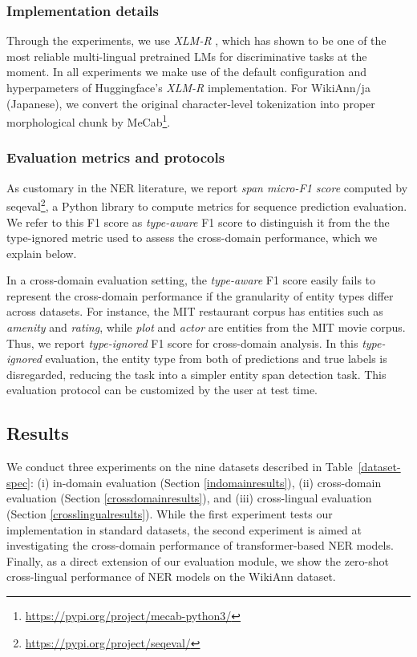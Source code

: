 \documentclass[11pt,a4paper]{article}
\begin{document}
\subsubsection{Implementation details}
Through the experiments, we use {\it XLM-R} \citep{liu2019roberta}, which has shown to be one of the most reliable multi-lingual pretrained LMs for discriminative tasks at the moment. In all experiments we make use of the default configuration and hyperpameters of Huggingface's {\it XLM-R} implementation. For WikiAnn/ja (Japanese), we convert the original character-level tokenization into proper morphological chunk by MeCab\footnote{\url{https://pypi.org/project/mecab-python3/}}.

\subsubsection{Evaluation metrics and protocols}

As customary in the NER literature, we report \textit{span micro-F1 score} computed by seqeval\footnote{\url{https://pypi.org/project/seqeval/}}, a Python library to compute metrics for sequence prediction evaluation.
We refer to this F1 score as \textit{type-aware} F1 score to distinguish it from the the type-ignored metric used to assess the cross-domain performance, which we explain below. 

In a cross-domain evaluation setting, the \textit{type-aware} F1 score easily fails to represent the cross-domain performance if the granularity of entity types differ across datasets.
For instance, the MIT restaurant corpus has entities such as {\it amenity} and {\it rating}, while {\it plot} and {\it actor} are entities from the MIT movie corpus.
Thus, we report {\it type-ignored} F1 score for cross-domain analysis. In this {\it type-ignored} evaluation, the entity type from both of predictions and true labels is disregarded, reducing the task into a simpler entity span detection task. 
This evaluation protocol can be customized by the user at test time.

\subsection{Results}
We conduct three experiments on the nine datasets described in Table~\ref{dataset-spec}: (i) in-domain evaluation (Section \ref{indomainresults}), (ii) cross-domain evaluation (Section \ref{crossdomainresults}), and (iii) cross-lingual evaluation (Section \ref{crosslingualresults}). While the first experiment tests our implementation in standard datasets, the second experiment is aimed at investigating the cross-domain performance of transformer-based NER models.
Finally, as a direct extension of our evaluation module, we show the zero-shot cross-lingual performance of NER models on the WikiAnn dataset. 
\end{document}
